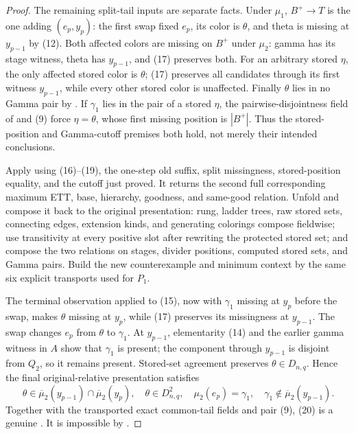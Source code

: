 \begin{proof}
The remaining split-tail inputs are separate facts.  Under \(\mu_1\),
\(B^+\to T\) is the one  adding
\((e_p,y_p)\): the first swap fixed \(e_p\), its color is \(\theta\), and
theta is missing at \(y_{p-1}\) by (12).  Both affected colors are missing
on \(B^+\) under \(\mu_2\): gamma has its stage witness, theta has
\(y_{p-1}\), and (17) preserves both.  For an arbitrary stored
\(\eta\), the only affected stored color is \(\theta\); (17) preserves all
candidates through its first witness \(y_{p-1}\), while every other stored
color is unaffected.  Finally \(\theta\) lies in no Gamma pair by
.  If \(\gamma_1\) lies in the
pair of a stored \(\eta\), the pairwise-disjointness field of
 and
(9) force \(\eta=\theta\), whose first missing position is
\(|B^+|\).  Thus the stored-position and Gamma-cutoff premises both hold,
not merely their intended conclusions.

Apply  using (16)--(19), the
one-step old suffix, split missingness, stored-position equality, and the
cutoff just proved.  It returns the second full corresponding maximum ETT,
base, hierarchy, goodness, and same-good relation.  Unfold
 and compose it back to the
original presentation: rung, ladder trees, raw stored sets, connecting
edges, extension kinds, and generating colorings compose fieldwise; use
transitivity  at every positive 
slot after rewriting the protected stored set; and compose the two
 relations on stages, divider positions,
computed stored sets, and Gamma pairs.  Build the new counterexample and
minimum context by the same six explicit transports used for \(P_1\).

The terminal observation applied to (15), now with \(\gamma_1\) missing
at \(y_p\) before the swap, makes \(\theta\) missing at \(y_p\), while
(17) preserves its missingness at \(y_{p-1}\).  The swap changes
\(e_p\) from \(\theta\) to \(\gamma_1\).  At \(y_{p-1}\), elementarity
(14) and the earlier gamma witness in \(A\) show that \(\gamma_1\) is
present; the component through \(y_{p-1}\) is disjoint from \(Q_2\), so
it remains present.  Stored-set agreement preserves
\(\theta\in D_{n,q}\).  Hence the final original-relative presentation
satisfies
\[
 \theta\in\overline\mu_2(y_{p-1})\cap\overline\mu_2(y_p),
 \quad \theta\in D^2_{n,q},\quad
 \mu_2(e_p)=\gamma_1,\quad
 \gamma_1\notin\overline\mu_2(y_{p-1}).                       \tag{20}
\]
Together with the transported exact common-tail fields and pair (9),
(20) is a genuine .  It is
impossible by .


\end{proof}

